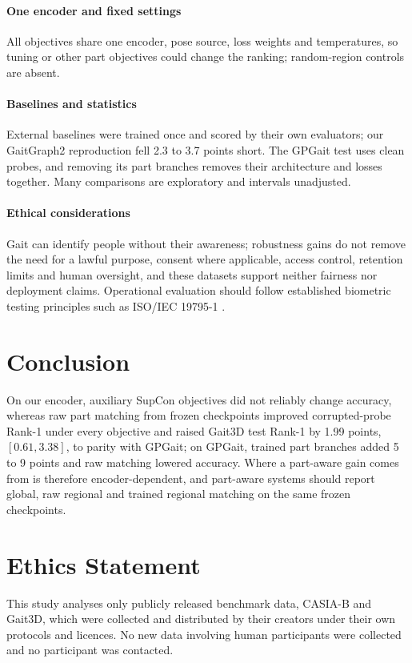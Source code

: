 \documentclass[journal]{IEEEtran}
\begin{document}
\paragraph{One encoder and fixed settings}
All objectives share one encoder, pose source, loss weights and temperatures,
so tuning or other part objectives could change the ranking; random-region
controls are absent.

\paragraph{Baselines and statistics}
External baselines were trained once and scored by their own evaluators; our
GaitGraph2 reproduction fell 2.3 to 3.7 points short. The GPGait test uses clean
probes, and removing its part branches removes their architecture and losses
together. Many comparisons are exploratory and intervals unadjusted.

\paragraph{Ethical considerations}
Gait can identify people without their awareness; robustness gains do not
remove the need for a lawful purpose, consent where applicable, access control,
retention limits and human oversight, and these datasets support neither
fairness nor deployment claims. Operational evaluation should follow
established biometric testing principles such as ISO/IEC 19795-1
\cite{iso19795}.

\section{Conclusion}
\label{sec:conclusion}

On our encoder, auxiliary SupCon objectives did not reliably change accuracy,
whereas raw part matching from frozen checkpoints improved corrupted-probe
Rank-1 under every objective and raised Gait3D test Rank-1 by 1.99 points,
$[0.61,3.38]$, to parity with GPGait; on GPGait, trained part branches added 5 to
9 points and raw matching lowered accuracy. Where a part-aware gain comes from
is therefore encoder-dependent, and part-aware systems should report global,
raw regional and trained regional matching on the same frozen checkpoints.


\section*{Ethics Statement}
This study analyses only publicly released benchmark data, CASIA-B and Gait3D,
which were collected and distributed by their creators under their own
protocols and licences. No new data involving human participants were collected
and no participant was contacted.
\end{document}
